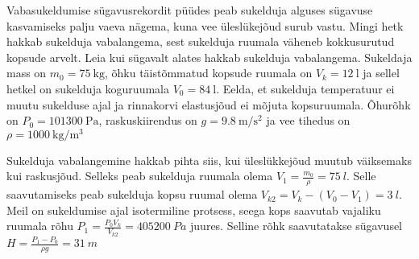 
Vabasukeldumise sügavusrekordit püüdes peab sukelduja alguses sügavuse kasvamiseks palju vaeva nägema, kuna vee üleslükejõud surub vastu. Mingi hetk hakkab sukelduja vabalangema, sest sukelduja ruumala väheneb kokkusurutud kopsude arvelt. Leia kui sügavalt alates hakkab sukelduja vabalangema. Sukeldaja mass on $m_0 = \SI{75}{\kg}$, õhku täistõmmatud kopsude ruumala on $V_{k} = \SI{12}{\l}$ ja sellel hetkel on sukelduja koguruumala $V_0 = \SI{84}{\l}$. Eelda, et sukelduja temperatuur ei muutu sukelduse ajal ja rinnakorvi elastusjõud ei mõjuta kopsuruumala. Õhurõhk on $P_0 = \SI{101300}{\Pa}$, raskuskiirendus on $g = \SI{9.8}{\m\per\s\squared}$ ja vee tihedus on $\rho = \SI{1000}{\kg\per\m\cubed}$






\hint

\solu
Sukelduja vabalangemine hakkab pihta siis, kui üleslükkejõud muutub väiksemaks kui raskusjõud. Selleks peab sukelduja ruumala olema $V_1 = \frac{m_0}{\rho} = \SI{75}{l}$. Selle saavutamiseks peab sukelduja kopsu ruumal olema $V_{k2} = V_{k} - (V_0 - V_1) = \SI{3}{l}$. Meil on sukeldumise ajal isotermiline protsess, seega kops saavutab vajaliku ruumala rõhu $P_1 = \frac{P_0V_{k}}{V_{k2}} = \SI{405200}{Pa}$ juures. Selline rõhk saavutatakse sügavusel $H = \frac{P_1 - P_0}{\rho g} = \SI{31}{m}$
\probend